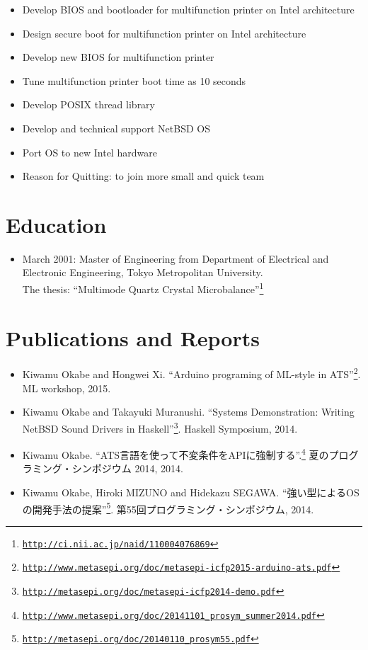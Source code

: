 \documentclass[letterpaper]{article}
\begin{document}
\begin{itemize}
  \item Develop BIOS and bootloader for multifunction printer on Intel architecture
  \item Design secure boot for multifunction printer on Intel architecture
  \item Develop new BIOS for multifunction printer
  \item Tune multifunction printer boot time as 10 seconds
  \item Develop POSIX thread library
  \item Develop and technical support NetBSD OS
  \item Port OS to new Intel hardware
  \item Reason for Quitting: to join more small and quick team
\end{itemize}

\section*{Education}

\begin{itemize}
  \item March 2001: Master of Engineering from Department of Electrical and Electronic Engineering, Tokyo Metropolitan University. \\
    The thesis: ``Multimode Quartz Crystal Microbalance''\footnote{\href{http://ci.nii.ac.jp/naid/110004076869}{\tt http://ci.nii.ac.jp/naid/110004076869}}
\end{itemize}

\section*{Publications and Reports}

\begin{itemize}
  \item Kiwamu Okabe and Hongwei Xi. ``Arduino programing of ML-style in ATS''\footnote{\href{http://www.metasepi.org/doc/metasepi-icfp2015-arduino-ats.pdf}{\tt http://www.metasepi.org/doc/metasepi-icfp2015-arduino-ats.pdf}}. ML workshop, 2015.
  \item Kiwamu Okabe and Takayuki Muranushi. ``Systems Demonstration: Writing NetBSD Sound Drivers in Haskell''\footnote{\href{http://metasepi.org/doc/metasepi-icfp2014-demo.pdf}{\tt http://metasepi.org/doc/metasepi-icfp2014-demo.pdf}}. Haskell Symposium, 2014.
  \item Kiwamu Okabe. ``ATS言語を使って不変条件をAPIに強制する''.\footnote{\href{http://www.metasepi.org/doc/20141101\_prosym\_summer2014.pdf}{\tt http://www.metasepi.org/doc/20141101\_prosym\_summer2014.pdf}} 夏のプログラミング・シンポジウム 2014, 2014.
  \item Kiwamu Okabe, Hiroki MIZUNO and Hidekazu SEGAWA. ``強い型によるOSの開発手法の提案''\footnote{\href{http://metasepi.org/doc/20140110\_prosym55.pdf}{\tt http://metasepi.org/doc/20140110\_prosym55.pdf}}. 第55回プログラミング・シンポジウム, 2014.
\end{itemize}
\end{document}
